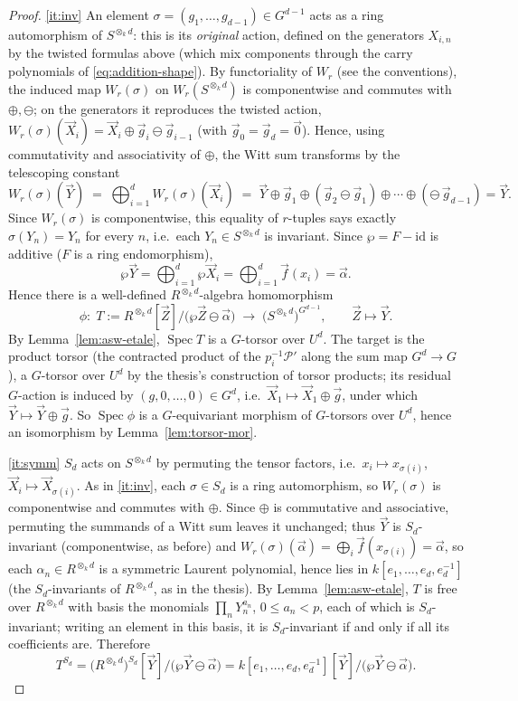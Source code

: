 \documentclass[11pt]{article}
\newcommand{\cP}{\mathcal{P}}
\DeclareMathOperator{\Spec}{Spec}
\newcommand{\AS}{\wp}
\newcommand{\vf}{\vec f}
\newcommand{\vX}{\vec X}
\newcommand{\vY}{\vec Y}
\newcommand{\vZ}{\vec Z}
\theoremstyle{plain}
\theoremstyle{definition}
\begin{document}
\begin{proof}
\ref{it:inv} An element $\sigma=(g_1,\dots,g_{d-1})\in G^{d-1}$ acts as a ring
automorphism of $S^{\otimes_kd}$: this is its \emph{original} action, defined on the
generators $X_{i,n}$ by the twisted formulas above (which mix components through the
carry polynomials of \eqref{eq:addition-shape}). By functoriality of $W_r$ (see the
conventions), the induced map $W_r(\sigma)$ on $W_r(S^{\otimes_kd})$ is componentwise
and commutes with $\oplus,\ominus$; on the generators it reproduces the twisted action,
$W_r(\sigma)(\vX_i)=\vX_i\oplus\vec g_i\ominus\vec g_{i-1}$ (with $\vec g_0=\vec
g_d=\vec 0$). Hence, using commutativity and associativity of $\oplus$, the Witt sum
transforms by the telescoping constant
\[
W_r(\sigma)(\vY)\;=\;\bigoplus_{i=1}^dW_r(\sigma)(\vX_i)\;=\;\vY\oplus
\vec g_1\oplus(\vec g_2\ominus\vec g_1)\oplus\cdots\oplus(\ominus\,\vec g_{d-1})
=\vY.
\]
Since $W_r(\sigma)$ is componentwise, this equality of $r$-tuples says exactly
$\sigma(Y_n)=Y_n$ for every $n$, i.e.\ each $Y_n\in S^{\otimes_kd}$ is invariant. Since $\AS=F-\mathrm{id}$ is additive
($F$ is a ring endomorphism),
\[
\AS\vY=\bigoplus_{i=1}^d\AS\vX_i=\bigoplus_{i=1}^d\vf(x_i)=\vec\alpha .
\]
Hence there is a well-defined $R^{\otimes_kd}$-algebra homomorphism
\[
\phi\colon\; T:=R^{\otimes_kd}[\vZ]\big/\bigl(\AS\vZ\ominus\vec\alpha\bigr)
\;\longrightarrow\;\bigl(S^{\otimes_kd}\bigr)^{G^{d-1}},
\qquad \vZ\mapsto\vY .
\]
By Lemma~\ref{lem:asw-etale}, $\Spec T$ is a $G$-torsor over $U^d$. The target is the
product torsor (the contracted product of the $p_i^{-1}\cP'$ along the sum map
$G^d\to G$), a $G$-torsor over $U^d$ by the thesis's construction of torsor products;
its residual $G$-action is induced by $(g,0,\dots,0)\in G^d$, i.e.\
$\vX_1\mapsto\vX_1\oplus\vec g$, under which $\vY\mapsto\vY\oplus\vec g$. So
$\Spec\phi$ is a $G$-equivariant morphism of $G$-torsors over $U^d$, hence an
isomorphism by Lemma~\ref{lem:torsor-mor}.

\ref{it:symm} $S_d$ acts on $S^{\otimes_kd}$ by permuting the tensor factors, i.e.\
$x_i\mapsto x_{\sigma(i)}$, $\vX_i\mapsto\vX_{\sigma(i)}$. As in \ref{it:inv}, each
$\sigma\in S_d$ is a ring automorphism, so $W_r(\sigma)$ is componentwise and commutes
with $\oplus$. Since $\oplus$ is commutative
and associative, permuting the summands of a Witt sum leaves it unchanged; thus
$\vY$ is $S_d$-invariant (componentwise, as before) and
$W_r(\sigma)(\vec\alpha)=\bigoplus_i\vf(x_{\sigma(i)})=\vec\alpha$, so each
$\alpha_n\in R^{\otimes_kd}$ is a symmetric Laurent polynomial, hence lies in
$k[e_1,\dots,e_d,e_d^{-1}]$ (the $S_d$-invariants of $R^{\otimes_kd}$, as in the
thesis). By Lemma~\ref{lem:asw-etale}, $T$ is free over $R^{\otimes_kd}$ with basis the
monomials $\prod_nY_n^{a_n}$, $0\le a_n<p$, each of which is $S_d$-invariant; writing an
element in this basis, it is $S_d$-invariant if and only if all its coefficients are.
Therefore
\[
T^{S_d}=\bigl(R^{\otimes_kd}\bigr)^{S_d}[\vY]\big/\bigl(\AS\vY\ominus\vec\alpha\bigr)
=k[e_1,\dots,e_d,e_d^{-1}][\vY]\big/\bigl(\AS\vY\ominus\vec\alpha\bigr).
\]


\end{proof}
\end{document}
